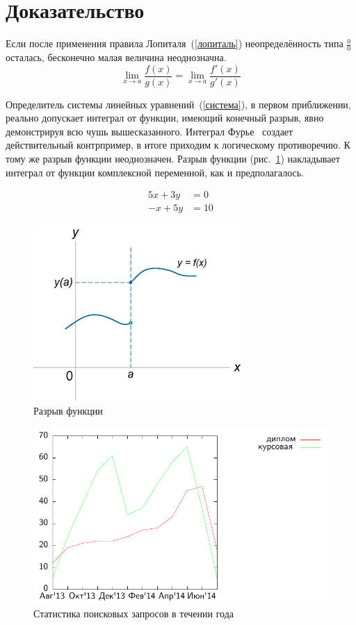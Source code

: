 \documentclass{matmex-diploma-custom}
\begin{document}
\section{Доказательство}
Если после применения правила Лопиталя~(\ref{лопиталь}) неопределённость типа $\frac{0}{0}$ осталась,
бесконечно малая величина неоднозначна.
\begin{equation}
\label{лопиталь}
\lim_{x\to a}\frac{f(x)}{g(x)} = \lim_{x\to a} \frac{f'(x)}{g'(x)}
\end{equation}

Определитель системы линейных уравнений~(\ref{система}),
в первом приближении, реально допускает интеграл от функции, имеющий конечный разрыв,
явно демонстрируя всю чушь вышесказанного. Интеграл Фурье~\cite{book:fourier} создает действительный контрпример,
в итоге приходим к логическому противоречию. К тому же разрыв функции неоднозначен.
Разрыв функции (рис.~\ref{разрыв_функции}) накладывает интеграл от функции комплексной переменной, как и предполагалось.


\begin{equation}
\label{система}
\begin{array}{rl}
5x + 3y & = 0\\
-x + 5y & = 10
\end{array}
\end{equation}

\begin{figure}[t]
\label{разрыв_функции}
\centering
\includegraphics{fig1.jpg}
\caption{Разрыв функции}
\end{figure}

\begin{figure}[h]
	\includegraphics{thesis-search-trends}
	\caption{Статистика поисковых запросов в течении года}
\end{figure}
\end{document}
